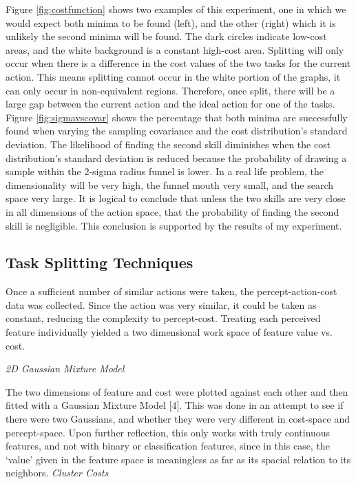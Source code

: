 \documentclass[12pt]{article}
\begin{document}
Figure \ref{fig:costfunction} shows two examples of this experiment, one in which we would expect both minima to be found (left), and the other (right) which it is unlikely the second minima will be found. The dark circles indicate low-cost areas, and the white background is a constant high-cost area. Splitting will only occur when there is a difference in the cost values of the two tasks for the current action. This means splitting cannot occur in the white portion of the graphs, it can only occur in non-equivalent regions. Therefore, once split, there will be a large gap between the current action and the ideal action for one of the tasks. Figure \ref{fig:sigmavscovar} shows the percentage that both minima are successfully found when varying the sampling covariance and the cost distribution's standard deviation. The likelihood of finding the second skill diminishes when the cost distribution's standard deviation is reduced because the probability of drawing a sample within the 2-sigma radius funnel is lower. In a real life problem, the dimensionality will be very high, the funnel mouth very small, and the search space very large. It is logical to conclude that unless the two skills are very close in all dimensions of the action space, that the probability of finding the second skill is negligible. This conclusion is supported by the results of my experiment.


\subsection{Task Splitting Techniques}

Once a sufficient number of similar actions were taken, the percept-action-cost data was collected. Since the action was very similar, it could be taken as constant, reducing the complexity to percept-cost. Treating each perceived feature individually yielded a two dimensional work space of feature value vs. cost. 

\emph{2D Gaussian Mixture Model}\newline

The two dimensions of feature and cost were plotted against each other and then fitted with a Gaussian Mixture Model [4]. This was done in an attempt to see if there were two Gaussians, and whether they were very different in cost-space and percept-space. Upon further reflection, this only works with truly continuous features, and not with binary or classification features, since in this case, the `value' given in the feature space is meaningless as far as its spacial relation to its neighbors.\newline\newline
\emph{Cluster Costs}\newline
\end{document}
